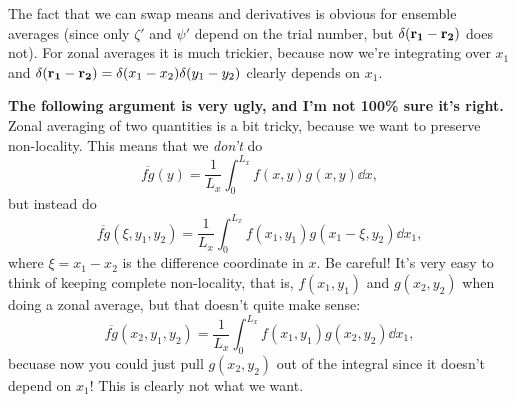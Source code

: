 \documentclass{paper}
\newcommand*{\mean}[1]{\overline{#1}}
\newcommand{\rr}[1]{\vb{r_{#1}}}
\begin{document}
The fact that we can swap means and derivatives is obvious for ensemble averages (since only $\zeta'$ and $\psi'$ depend on the trial number, but $\delta(\rr1 - \rr2)$ does not). For zonal averages it is much trickier, because now we're integrating over $x_1$ and $\delta(\rr1-\rr2) = \delta(x_1 - x_2) \delta(y_1 - y_2)$ clearly depends on $x_1$.

\textbf{The following argument is very ugly, and I'm not 100\% sure it's right.}
Zonal averaging of two quantities is a bit tricky, because we want to preserve non-locality. This means that we \emph{don't} do
\begin{equation}
  \label{eq:zonal-wrong}
  \mean{fg}(y) = \frac{1}{L_x} \int_0^{L_x} f(x, y) g(x, y) \dd{x},
\end{equation}
but instead do
\begin{equation}
  \label{eq:zonal-right}
  \mean{fg}(\xi, y_1, y_2) = \frac{1}{L_x} \int_0^{L_x} f(x_1, y_1) g(x_1 - \xi, y_2) \dd{x_1},
\end{equation}
where $\xi = x_1 - x_2$ is the difference coordinate in $x$. Be careful! It's very easy to think of keeping complete non-locality, that is, $f(x_1, y_1)$ and $g(x_2, y_2)$ when doing a zonal average, but that doesn't quite make sense:
\begin{equation}
  \label{eq:zonal-not-right}
  \mean{fg}(x_2, y_1, y_2) = \frac{1}{L_x} \int_0^{L_x} f(x_1, y_1) g(x_2, y_2) \dd{x_1},
\end{equation}
becuase now you could just pull $g(x_2, y_2)$ out of the integral since it doesn't depend on $x_1$! This is clearly not what we want.
\end{document}

